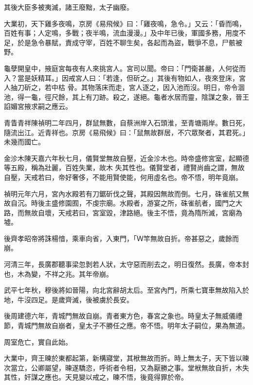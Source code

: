 \begin{pinyinscope}
 其後大臣多被夷滅，諸王廢黜，太子幽廢。



 大業初，天下雞多夜鳴，京房《易飛候》曰：「雞夜鳴，急令。」又云：「昏而鳴，百姓有事；人定鳴，多戰；夜半鳴，流血漫漫。」及中年已後，軍國多務，用度不足，於是急令暴賦，責成守宰，百姓不聊生矣，各起而為盜，戰爭不息，尸骸被野。



 龜孽開皇中，掖庭宮每夜有人來挑宮人。宮司以聞。帝曰：「門衛甚嚴，人何從而入？當是妖精耳。」因戒宮人曰：「若逢，但斫之。」其後有物如人，夜來登床，宮人抽刀斫之，若中枯
 骨。其物落床而走，宮人逐之，因入池而沒。明日，帝令涸池，得一龜，徑尺餘，其上有刀跡。殺之，遂絕。龜者水居而靈，陰謀之象，晉王諂媚宮掖求嗣之應云。



 青眚青祥陳禎明二年四月，群鼠無數，自蔡洲岸入石頭淮，至青塘兩岸。數日死，隨流出江。近青祥也。京房《易飛候》曰：「鼠無故群居，不穴眾聚者，其君死。」未幾而國亡。



 金沴木陳天嘉六年秋七月，儀賢堂無故自壓，近金沴木也。時帝盛修宮室，起顯德等五殿，稱為壯麗，百姓失業，故木
 失其性也。儀賢堂者，禮賢尚齒之謂，無故自壓，天戒若曰，帝好奢侈，不能用賢使能，何用虛名也。帝不悟，明年竟崩。



 禎明元年六月，宮內水殿若有刀鋸斫伐之聲，其殿因無故而倒。七月，硃雀航又無故自沉。時後主盛修園囿，不虔宗廟。水殿者，游宴之所，硃雀航者，國門之大路，而無故自壞，天戒若曰，宮室毀，津路絕。後主不悟，竟為隋所滅，宮廟為墟。



 後齊孝昭帝將誅楊愔，乘車向省，入東門，「Ｗ竿無故自折。帝甚惡之，歲餘而崩。



 河清三年，長廣郡聽事梁忽剝若人狀，太守惡而削去之，明日復然。長廣，帝本封也，木為變，不祥之兆。其年帝崩。



 武平七年秋，穆後將如晉陽，向北宮辭胡太后。至宮內門，所乘七寶車無故陷入於地，牛沒四足。是歲齊滅，後被虜於長安。



 後周建德六年，青城門無故自崩。青者東方色，春宮之象也。時皇太子無威儀禮節，青城門無故自崩者，皇太子不勝任之應。帝不悟。明年太子嗣位，果為無道。



 周室危亡，實自此始。



 大業中，齊王暕於東都起第，新構寢堂，其栿無故而折。時上無太子，天下皆以暕次當立，公卿屬望，暕遂驕恣，呼術者令相，又為厭勝之事。堂栿無故自折，木失其性，奸謀之應也。天見變以戒之，暕不悟，後竟得罪於帝。




\end{pinyinscope}
